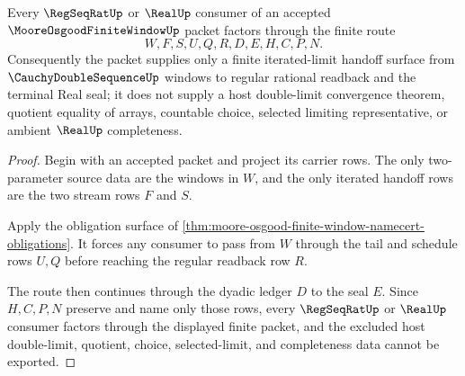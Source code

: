 \begin{theorem}\label{thm:moore-osgood-finite-window-limit-handoff}
Every $\RegSeqRatUp$ or $\RealUp$ consumer of an accepted $\MooreOsgoodFiniteWindowUp$ packet factors through the finite route
$$
W,F,S,U,Q,R,D,E,H,C,P,N .
$$
Consequently the packet supplies only a finite iterated-limit handoff surface from $\CauchyDoubleSequenceUp$ windows to regular rational readback and the terminal Real seal; it does not supply a host double-limit convergence theorem, quotient equality of arrays, countable choice, selected limiting representative, or ambient $\RealUp$ completeness.
\end{theorem}
\begin{proof}
Begin with an accepted packet and project its carrier rows. The only two-parameter source data are the windows in $W$, and the only iterated handoff rows are the two stream rows $F$ and $S$.

Apply the obligation surface of \autoref{thm:moore-osgood-finite-window-namecert-obligations}. It forces any consumer to pass from $W$ through the tail and schedule rows $U,Q$ before reaching the regular readback row $R$.

The route then continues through the dyadic ledger $D$ to the seal $E$. Since $H,C,P,N$ preserve and name only those rows, every $\RegSeqRatUp$ or $\RealUp$ consumer factors through the displayed finite packet, and the excluded host double-limit, quotient, choice, selected-limit, and completeness data cannot be exported.
\end{proof}





